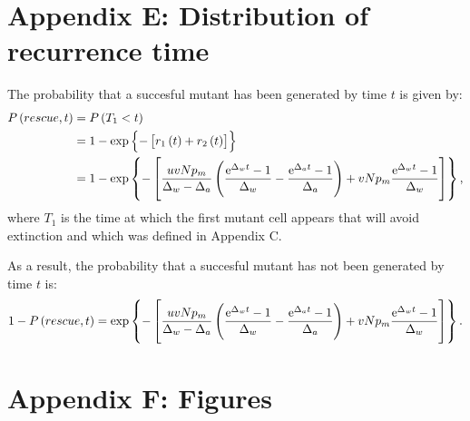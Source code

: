 \documentclass[12pt]{extarticle}
\newcommand{\e}{{\rm e}}
\begin{document}
\begin{appendices}
\section*{Appendix E: Distribution of recurrence time}
The probability that a succesful mutant has been generated by time $t$ is given by:
\begin{align*}
P\left(rescue,t\right)&=P\left(T_1<t\right)\\
&=1-\exp\left\{-\left[r_1\left(t\right)+r_2\left(t\right)\right]\right\}\\
&=1-\exp\left\{-\left[\frac{uvNp_m}{\Delta_w-\Delta_a}\left(\frac{\e^{\Delta_wt}-1}{\Delta_w}-\frac{\e^{\Delta_at}-1}{\Delta_a}\right)+ vNp_m\frac{\e^{\Delta_w t}-1}{\Delta_w}\right]\right\},
\end{align*}
where $T_1$ is the time at which the first mutant cell appears that will avoid extinction and which was defined in Appendix C.

As a result, the probability that a succesful mutant has not been generated by time $t$ is:
\begin{equation}
1-P\left(rescue,t\right)=\exp\left\{-\left[\frac{uvNp_m}{\Delta_w-\Delta_a}\left(\frac{\e^{\Delta_wt}-1}{\Delta_w}-\frac{\e^{\Delta_at}-1}{\Delta_a}\right)+ vNp_m\frac{\e^{\Delta_w t}-1}{\Delta_w}\right]\right\}.
\end{equation}
\newpage
\section*{Appendix F: Figures}


\end{appendices}
\end{document}
